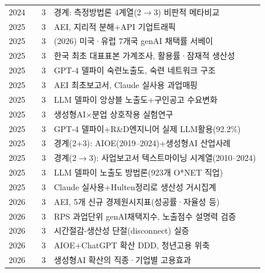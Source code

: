 \documentclass[11pt]{article}
\begin{document}
\begin{longtable}{L{0.9cm}L{4.6cm}L{0.9cm}L{6.2cm}}
2024 & \textcite{lee-2024-generative-ai-labor-market-measurement} & 3 & 경계: 측정방법론 4계열(2$\to$3) 비판적 메타비교 \\
2025 & \textcite{appel-2025-uneven-geographic-and-enterprise-ai} & 3 & AEI, 지리적 분해+API 기업트래픽 \\
2025 & \textcite{bick-2026-mind-the-gap-ai-adoption} & 3 & (2026) 미국·유럽 7개국 genAI 채택률 서베이 \\
2025 & \textcite{bok-2025-rapid-ai-diffusion-productivity-effects} & 3 & 한국 최초 대표표본 가계조사, 활용률·잠재적 생산성 \\
2025 & \textcite{chang-2025-ai-era-skills} & 3 & GPT-4 델파이 숙련노출도, 숙련 네트워크 구조 \\
2025 & \textcite{handa-2025-which-economic-tasks-are} & 3 & AEI 최초보고서, Claude 실사용 과업매핑 \\
2025 & \textcite{keis-2025-ai-job-exposure-labor-demand} & 3 & LLM 델파이 앙상블 노출도+구인공고 수요변화 \\
2025 & \textcite{min-2025-productivity-gains-generative-ai} & 3 & 생성형AI$\times$분업 상호작용 실험연구 \\
2025 & \textcite{noh-2025-ai-based-manufacturing-innovation-employment} & 3 & GPT-4 델파이+R\&D엔지니어 실제 LLM활용(92.2\%) \\
2025 & \textcite{noh-2025-ai-labor-coexistence} & 3 & 경계(2+3): AIOE(2019--2024)+생성형AI 산업사례 \\
2025 & \textcite{seo-2025-ai-adoption-characteristics-business-reports} & 3 & 경계(2$\to$3): 사업보고서 텍스트마이닝 시계열(2010--2024) \\
2025 & \textcite{son-2025-llm-based-ai-job-exposure-measurement} & 3 & LLM 델파이 노출도 방법론(923개 O*NET 직업) \\
2025 & \textcite{tamkin-2025-estimating-ai-productivity-gains-from} & 3 & Claude 실사용+Hulten정리로 생산성 거시집계 \\
2026 & \textcite{appel-2026-economic-primitives} & 3 & AEI, 5개 신규 경제원시지표(성공률·자율성 등) \\
2026 & \textcite{bick-2026-what-work-does-generative} & 3 & RPS 과업단위 genAI채택지수, 노출점수 설명력 검증 \\
2026 & \textcite{bok-2026-ai-adoption-productivity-effects} & 3 & 시간절감-생산성 단절(disconnect) 실증 \\
2026 & \textcite{bok-2026-youth-employment-decline-ai-career-ladder} & 3 & AIOE+ChatGPT 확산 DDD, 청년고용 위축 \\
2026 & \textcite{chang-2026-ai-technology-diffusion-employment} & 3 & 생성형AI 확산의 직종·기업별 고용효과 \\

\end{longtable}
\end{document}
